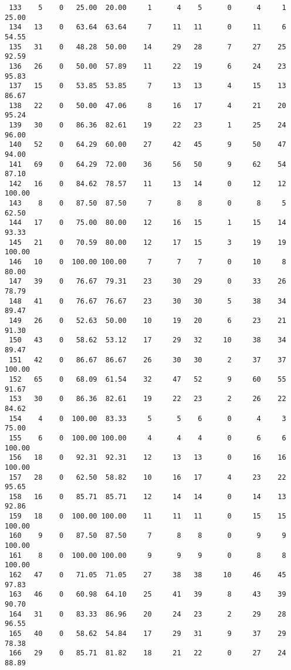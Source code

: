 \begin{verbatim}
 133    5    0   25.00  20.00     1      4    5      0      4     1    25.00
 134   13    0   63.64  63.64     7     11   11      0     11     6    54.55
 135   31    0   48.28  50.00    14     29   28      7     27    25    92.59
 136   26    0   50.00  57.89    11     22   19      6     24    23    95.83
 137   15    0   53.85  53.85     7     13   13      4     15    13    86.67
 138   22    0   50.00  47.06     8     16   17      4     21    20    95.24
 139   30    0   86.36  82.61    19     22   23      1     25    24    96.00
 140   52    0   64.29  60.00    27     42   45      9     50    47    94.00
 141   69    0   64.29  72.00    36     56   50      9     62    54    87.10
 142   16    0   84.62  78.57    11     13   14      0     12    12   100.00
 143    8    0   87.50  87.50     7      8    8      0      8     5    62.50
 144   17    0   75.00  80.00    12     16   15      1     15    14    93.33
 145   21    0   70.59  80.00    12     17   15      3     19    19   100.00
 146   10    0  100.00 100.00     7      7    7      0     10     8    80.00
 147   39    0   76.67  79.31    23     30   29      0     33    26    78.79
 148   41    0   76.67  76.67    23     30   30      5     38    34    89.47
 149   26    0   52.63  50.00    10     19   20      6     23    21    91.30
 150   43    0   58.62  53.12    17     29   32     10     38    34    89.47
 151   42    0   86.67  86.67    26     30   30      2     37    37   100.00
 152   65    0   68.09  61.54    32     47   52      9     60    55    91.67
 153   30    0   86.36  82.61    19     22   23      2     26    22    84.62
 154    4    0  100.00  83.33     5      5    6      0      4     3    75.00
 155    6    0  100.00 100.00     4      4    4      0      6     6   100.00
 156   18    0   92.31  92.31    12     13   13      0     16    16   100.00
 157   28    0   62.50  58.82    10     16   17      4     23    22    95.65
 158   16    0   85.71  85.71    12     14   14      0     14    13    92.86
 159   18    0  100.00 100.00    11     11   11      0     15    15   100.00
 160    9    0   87.50  87.50     7      8    8      0      9     9   100.00
 161    8    0  100.00 100.00     9      9    9      0      8     8   100.00
 162   47    0   71.05  71.05    27     38   38     10     46    45    97.83
 163   46    0   60.98  64.10    25     41   39      8     43    39    90.70
 164   31    0   83.33  86.96    20     24   23      2     29    28    96.55
 165   40    0   58.62  54.84    17     29   31      9     37    29    78.38
 166   29    0   85.71  81.82    18     21   22      0     27    24    88.89

\end{verbatim}
